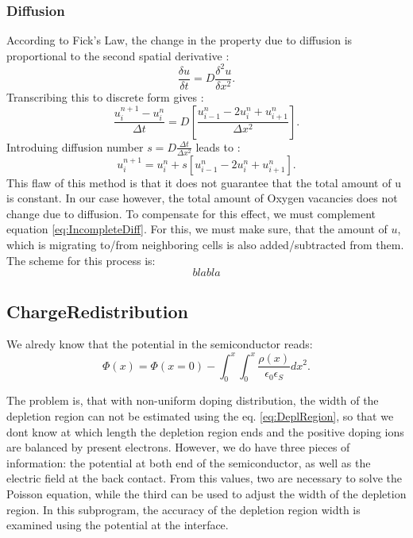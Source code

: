 \documentclass[12pt]{article}
\begin{document}
		\subsubsection{Diffusion}
		According to Fick's Law, the change in the property due to diffusion is proportional to the second spatial derivative :
		\begin{equation}
			\frac{\delta u}{\delta t} = D\frac{\delta ^2 u}{\delta x^2}.
		\end{equation}
		Transcribing this to discrete form gives :
		\begin{equation}
			\frac{u^{n+1}_{i}-u^{n}_{i}}{\Delta t} = D \left[ \frac{u^{n}_{i-1} - 2 u^{n}_{i} + u^{n}_{i+1}}{\Delta x^2} \right].
		\end{equation}
		Introduing diffusion number \( s = D \frac{\Delta t}{\Delta x^2} \) leads to :
		\begin{equation}
			\label{eq:IncompleteDiff}
			u^{n+1}_{i} = u^{n}_{i} + s \left[ u^{n}_{i-1} - 2 u^{n}_{i} + u^{n}_{i+1} \right].
		\end{equation}
		This flaw of this method is that it does not guarantee that the total amount of u is constant. In our case however, the total amount of Oxygen vacancies does not change due to diffusion. To compensate for this effect, we must complement equation \ref{eq:IncompleteDiff}. For this, we must make sure, that the amount of \( u\), which is migrating to/from neighboring cells is also added/subtracted from them.
		The scheme for this process is:
		\begin{equation}
		blabla
		\end{equation}
		
	  \subsection{ChargeRedistribution}
	 We alredy know that the potential in the semiconductor reads:
	\begin{equation}
	\Phi (x) = \Phi(x = 0) - \int^{x}_{0} \int^{x}_{0} \frac{\rho (x)}{\epsilon_0 \epsilon_S} dx^2.	
	\end{equation}
	
	The problem is, that with non-uniform doping distribution, the width of the depletion region can not be estimated using the eq. \ref{eq:DeplRegion}, so that we dont know at which length the depletion region ends and the positive doping ions are balanced by present electrons.
However, we do have three pieces of information: the potential at both end of the semiconductor, as well as the electric field at the back contact. From this values, two are necessary to solve the Poisson equation, while the third can be used to adjust the width of the depletion region. In this subprogram, the accuracy of the depletion region width is examined using the potential at the interface.\\
\end{document}
